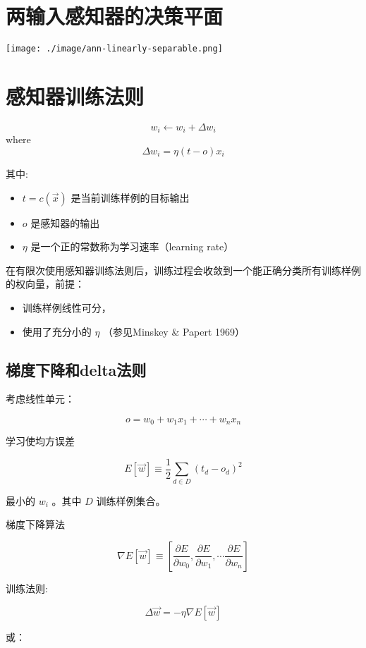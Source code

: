\documentclass{article}
\begin{document}
\section{两输入感知器的决策平面}
\label{sec-4}


\texttt{[image: ./image/ann-linearly-separable.png]}
\section{感知器训练法则}
\label{sec-5}



\[w_i \leftarrow w_i + \Delta w_i \]
where
\[ \Delta w_{i} = \eta (t - o) x_{i} \]

其中:

\begin{itemize}
\item $t=c(\vec{x})$ 是当前训练样例的目标输出
\item $o$ 是感知器的输出
\item $\eta$ 是一个正的常数称为学习速率（learning rate）
\end{itemize}


在有限次使用感知器训练法则后，训练过程会收敛到一个能正确分类所有训练样例的权向量，前提：
\begin{itemize}
\item 训练样例线性可分，
\item 使用了充分小的 $\eta$ （参见Minskey \& Papert 1969）
\end{itemize}
\subsection{梯度下降和delta法则}
\label{sec-5-1}


考虑线性单元：

\[ o = w_{0} + w_{1}x_1 + \cdots + w_n x_n \]

学习使均方误差

\[ E[\vec{w}] \equiv  \frac{1}{2}\sum_{d \in D}(t_{d} - o_{d})^{2} \]

最小的  $w_{i}$ 。其中 $D$ 训练样例集合。

梯度下降算法

\[ \nabla E[\vec{w}] \equiv \left[\frac{\partial E}{\partial w_{0}},
\frac{\partial E}{\partial w_{1}}, \cdots \frac{\partial E}{\partial
w_{n}}\right] \]

训练法则:

\[\Delta \vec{w} = -\eta \nabla E[\vec{w}] \]

或：
\end{document}
